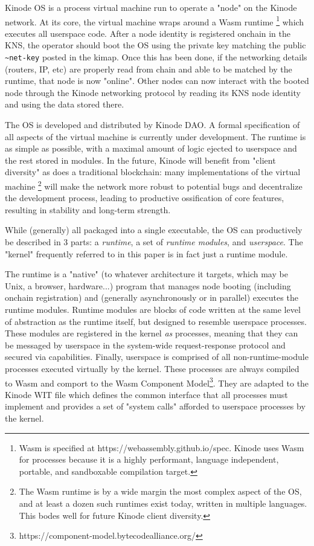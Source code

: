 \documentclass[runningheads]{llncs}
\begin{document}
Kinode OS is a process virtual machine run to operate a "node" on the Kinode network.
At its core, the virtual machine wraps around a Wasm runtime
\footnote{Wasm is specified at https://webassembly.github.io/spec. Kinode uses Wasm for processes because it is a highly performant, language independent, portable, and sandboxable compilation target.}
which executes all userspace code.
After a node identity is registered onchain in the KNS, the operator should boot the OS using the private key matching the public \verb|~net-key| posted in the kimap.
Once this has been done, if the networking details (routers, IP, etc) are properly read from chain and able to be matched by the runtime, that node is now "online".
Other nodes can now interact with the booted node through the Kinode networking protocol by reading its KNS node identity and using the data stored there.

The OS is developed and distributed by Kinode DAO. A formal specification of all aspects of the virtual machine is currently under development.
The runtime is as simple as possible, with a maximal amount of logic ejected to userspace and the rest stored in modules.
In the future, Kinode will benefit from "client diversity" as does a traditional blockchain: many implementations of the virtual machine
\footnote{The Wasm runtime is by a wide margin the most complex aspect of the OS, and at least a dozen such runtimes exist today, written in multiple languages.
This bodes well for future Kinode client diversity.}
will make the network more robust to potential bugs and decentralize the development process, leading to productive ossification of core features, resulting in stability and long-term strength.

While (generally) all packaged into a single executable, the OS can productively be described in 3 parts: a \textit{runtime}, a set of \textit{runtime modules}, and \textit{userspace}.
The "kernel" frequently referred to in this paper is in fact just a runtime module.

The runtime is a "native" (to whatever architecture it targets, which may be Unix, a browser, hardware...) program that manages node booting (including onchain registration) and (generally asynchronously or in parallel) executes the runtime modules.
Runtime modules are blocks of code written at the same level of abstraction as the runtime itself, but designed to resemble userspace processes.
These modules are registered in the kernel \textit{as} processes, meaning that they can be messaged by userspace in the system-wide request-response protocol and secured via capabilities.
Finally, userspace is comprised of all non-runtime-module processes executed virtually by the kernel.
These processes are always compiled to Wasm and comport to the Wasm Component Model\footnote{https://component-model.bytecodealliance.org/}.
They are adapted to the Kinode WIT file which defines the common interface that all processes must implement and provides a set of "system calls" afforded to userspace processes by the kernel.
\end{document}
